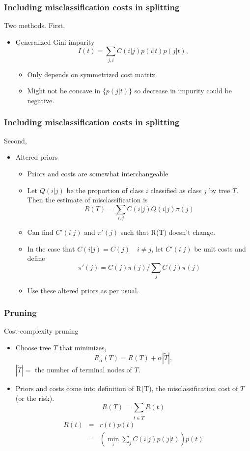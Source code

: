 \documentclass{beamer}
\begin{document}
\begin{frame}
	\frametitle{Including misclassification costs in splitting}
	Two methods.  First,
	\begin{itemize}
		\item Generalized Gini impurity 
				\[
				I(t) = \sum_{j, i}C(i|j)p(i|t)p(j|t),
				\]
			\begin{itemize}
				\item Only depends on symmetrized cost matrix
				\item Might not be concave in $\{p(j|t)\}$ so decrease in impurity could be negative.
			\end{itemize}
	
	\end{itemize}
\end{frame}

\begin{frame}
	\frametitle{Including misclassification costs in splitting}
	Second,
	\begin{itemize}
		\item Altered priors
		\begin{itemize}
			\item Priors and costs are somewhat interchangeable
			\item Let $Q(i|j)$ be the proportion of class $i$ classified as class $j$ by tree $T$.  Then the estimate of misclassification is
			\[
			R(T) = \sum_{i,j} C(i|j)Q(i|j)\pi(j)
			\]
			\item Can find $C'(i|j)$ and $\pi'(j)$ such that R(T) doesn't change.
			\item In the case that $C(i|j) = C(j) \quad i\ne j$, let $C'(i|j)$ be unit costs and define 
			\[
			\pi'(j) = C(j)\pi(j)/\sum_j C(j)\pi(j)
			\]
			\item Use these altered priors as per usual.
		\end{itemize}
	\end{itemize}
\end{frame}

\begin{frame}
	\frametitle{Pruning}
		Cost-complexity pruning
		\begin{itemize}
			\item Choose tree $T$ that minimizes,
			\[
			R_\alpha(T) = R(T) + \alpha |\widetilde{T}|,
			\]
			$|\widetilde{T}| =$ the number of terminal nodes of $T$.
			\item Priors and costs come into definition of R(T), the misclassification cost of $T$ (or the risk).
			\[
			R(T) = \sum_{t\in\widetilde{T}}R(t)
			\]
			\begin{eqnarray*}
			R(t) &=& r(t)p(t) \\
			&=& \left(\min_i \sum_j C(i|j)p(j|t) \right) p(t)
			\end{eqnarray*}
		\end{itemize}
\end{frame}
\end{document}

